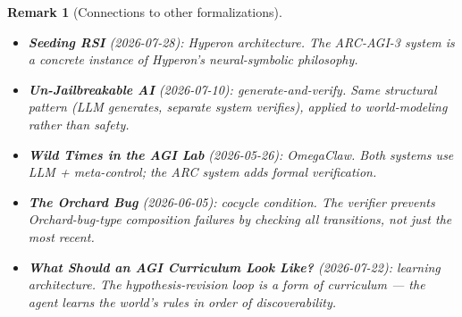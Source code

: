 \documentclass[11pt,a4paper]{article}
\newtheorem{remark}[definition]{Remark}
\begin{document}
\begin{remark}[Connections to other formalizations]
\begin{itemize}
\item \textbf{Seeding RSI} (2026-07-28): Hyperon architecture. The
  ARC-AGI-3 system is a concrete instance of Hyperon's
  neural-symbolic philosophy.
\item \textbf{Un-Jailbreakable AI} (2026-07-10): generate-and-verify.
  Same structural pattern (LLM generates, separate system verifies),
  applied to world-modeling rather than safety.
\item \textbf{Wild Times in the AGI Lab} (2026-05-26): OmegaClaw.
  Both systems use LLM + meta-control; the ARC system adds formal
  verification.
\item \textbf{The Orchard Bug} (2026-06-05): cocycle condition.
  The verifier prevents Orchard-bug-type composition failures by
  checking all transitions, not just the most recent.
\item \textbf{What Should an AGI Curriculum Look Like?} (2026-07-22):
  learning architecture. The hypothesis-revision loop is a form of
  curriculum --- the agent learns the world's rules in order of
  discoverability.
\end{itemize}
\end{remark}
\end{document}

